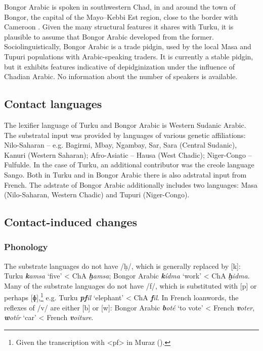 \documentclass[output=paper]{langsci/langscibook}
\begin{document}
Bongor Arabic is spoken in southwestern Chad, in and around the town of Bongor, the capital of the Mayo--Kebbi Est region, close to the border with Cameroon \citep{Luffin2013}. Given the many structural features it shares with Turku, it is plausible to assume that Bongor Arabic developed from the former. Sociolinguistically, Bongor Arabic is a trade pidgin, used by the local Masa and Tupuri populations with Arabic-speaking traders. It is currently a stable pidgin, but it exhibits features indicative of depidginization under the influence of Chadian Arabic. No information about the number of speakers is available.


 
 \subsection{Contact languages}


The lexifier language of Turku and Bongor Arabic is Western Sudanic Arabic. The substratal input was provided by languages of various genetic affiliations: Nilo-Saharan – e.g. Bagirmi, Mbay, Ngambay, Sar, Sara (Central Sudanic), Kanuri (Western Saharan); Afro-Asiatic – Hausa (West Chadic); Niger-Congo – Fulfulde. In the case of Turku, an additional contributor was the creole language Sango. Both in Turku and in Bongor Arabic there is also adstratal input from French. The adstrate of Bongor Arabic additionally includes two languages: Masa (Nilo-Saharan, Western Chadic) and Tupuri (Niger-Congo).


 
 \subsection{Contact-induced changes}
 \subsubsection{Phonology}

The substrate languages do not have /ḫ/, which is generally replaced by [k]: Turku \textbf{\textit{k}}\textit{amsa} ‘five’ < ChA \textbf{\textit{ḫ}}\textit{amsa}; Bongor Arabic \textbf{\textit{k}}\textit{ídma} ‘work’ < ChA \textbf{\textit{ḫ}}\textit{idma}. Many of the substrate languages do not have /f/, which is substituted with [p] or perhaps [ɸ],\footnote{Given the transcription with <pf> in Muraz (\citeyear[168]{Muraz1926}).} e.g. Turku \textit{\textbf{pf}il} ‘elephant’ < ChA \textit{\textbf{f}īl}. In French loanwords, the reflexes of /v/ are either [b] or [w]: Bongor Arabic \textit{\textbf{b}oté} ‘to vote’ < French \textit{\textbf{v}oter}, \textit{\textbf{w}otír} ‘car’ < French \textit{\textbf{v}oiture}.  
\end{document}
